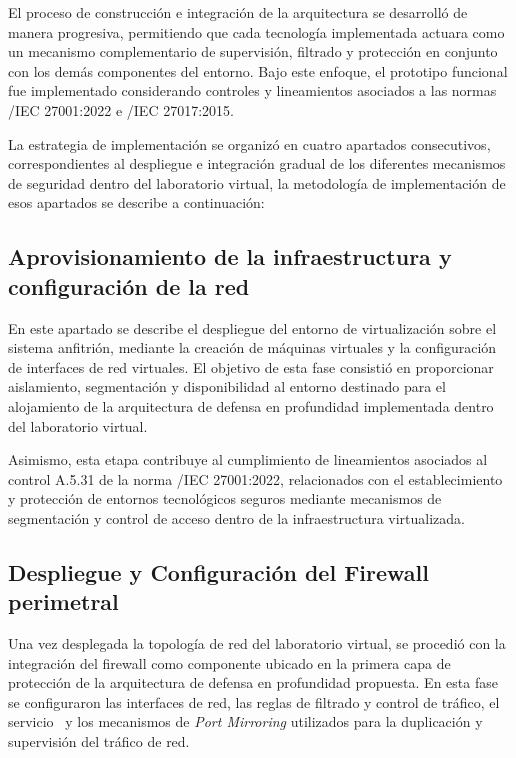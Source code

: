 El proceso de construcción e integración de la arquitectura se desarrolló de manera progresiva, permitiendo que cada tecnología 
implementada actuara como un mecanismo complementario de supervisión, filtrado y protección en conjunto con los demás componentes del 
entorno. Bajo este enfoque, el prototipo funcional fue implementado considerando controles y lineamientos asociados a las normas \ISO/IEC 
27001:2022 e \ISO/IEC 27017:2015.

La estrategia de implementación se organizó en cuatro apartados consecutivos, correspondientes al despliegue e integración gradual de los 
diferentes mecanismos de seguridad dentro del laboratorio virtual, la metodología de implementación de esos apartados se describe a 
continuación:

\subsection{Aprovisionamiento de la infraestructura y configuración de la red}
\noindent

En este apartado se describe el despliegue del entorno de virtualización sobre el sistema anfitrión, mediante la creación de 
máquinas virtuales y la configuración de interfaces de red virtuales. El objetivo de esta fase consistió en proporcionar aislamiento, 
segmentación y disponibilidad al entorno destinado para el alojamiento de la arquitectura de defensa en profundidad implementada dentro 
del laboratorio virtual.

Asimismo, esta etapa contribuye al cumplimiento de lineamientos asociados al control A.5.31 de la norma \ISO/IEC 27001:2022, relacionados 
con el establecimiento y protección de entornos tecnológicos seguros mediante mecanismos de segmentación y control de acceso dentro de la 
infraestructura virtualizada.

\subsection{Despliegue y Configuración del Firewall perimetral}
\noindent

Una vez desplegada la topología de red del laboratorio virtual, se procedió con la integración del firewall como componente ubicado en la 
primera capa de protección de la arquitectura de defensa en profundidad propuesta. En esta fase se configuraron las interfaces de red, las 
reglas de filtrado y control de tráfico, el servicio \DHCP\ y los mecanismos de \textit{Port Mirroring} utilizados para la duplicación y 
supervisión del tráfico de red.

